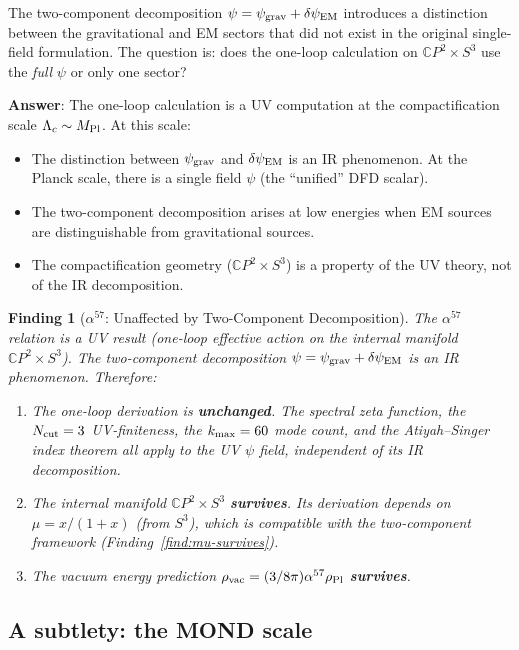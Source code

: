 \documentclass[11pt]{article}
\newtheorem{finding}{Finding}
\newcommand{\psigrav}{\psi_{\rm grav}}
\newcommand{\dpsiEM}{\delta\psi_{\rm EM}}
\newcommand{\mufd}{\mu}
\newcommand{\CP}{\mathbb{C}P}
\begin{document}
The two-component decomposition $\psi = \psigrav + \dpsiEM$ introduces
a distinction between the gravitational and EM sectors that did not
exist in the original single-field formulation. The question is: does
the one-loop calculation on $\CP^2 \times S^3$ use the \emph{full}
$\psi$ or only one sector?

\textbf{Answer}: The one-loop calculation is a UV computation at the
compactification scale $\Lambda_c \sim M_{\rm Pl}$. At this scale:
\begin{itemize}[nosep]
\item The distinction between $\psigrav$ and $\dpsiEM$ is an IR
  phenomenon. At the Planck scale, there is a single field $\psi$
  (the ``unified'' DFD scalar).
\item The two-component decomposition arises at low energies when
  EM sources are distinguishable from gravitational sources.
\item The compactification geometry ($\CP^2 \times S^3$) is a property
  of the UV theory, not of the IR decomposition.
\end{itemize}

\begin{finding}[$\alpha^{57}$: Unaffected by Two-Component Decomposition]
\label{find:alpha57-survives}
The $\alpha^{57}$ relation is a UV result (one-loop effective action
on the internal manifold $\CP^2 \times S^3$). The two-component
decomposition $\psi = \psigrav + \dpsiEM$ is an IR phenomenon.
Therefore:

\begin{enumerate}[nosep]
\item The one-loop derivation is \textbf{unchanged}. The spectral
  zeta function, the $N_{\rm cut} = 3$ UV-finiteness, the
  $k_{\rm max} = 60$ mode count, and the Atiyah--Singer index
  theorem all apply to the UV $\psi$ field, independent of its
  IR decomposition.
\item The internal manifold $\CP^2 \times S^3$ \textbf{survives}.
  Its derivation depends on $\mufd = x/(1+x)$ (from $S^3$),
  which is compatible with the two-component framework
  (Finding~\ref{find:mu-survives}).
\item The vacuum energy prediction
  $\rho_{\rm vac} = (3/8\pi)\alpha^{57}\rho_{\rm Pl}$
  \textbf{survives}.
\end{enumerate}
\end{finding}

\subsection{A subtlety: the MOND scale}
\end{document}
